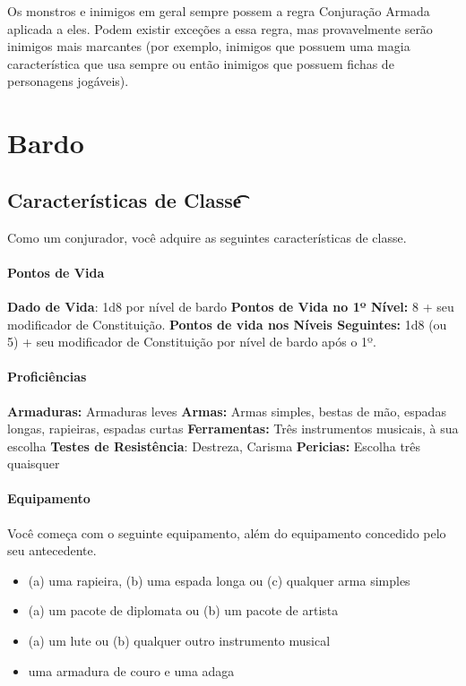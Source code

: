 \documentclass{RPG_Adventure}[2021/10/20]
\begin{document}
Os monstros e inimigos em geral sempre possem a regra Conjuração Armada aplicada
a eles. Podem existir exceções a essa regra, mas provavelmente serão inimigos
mais marcantes (por exemplo, inimigos que possuem uma magia característica que
usa sempre ou então inimigos que possuem fichas de personagens jogáveis).


\chapter{Bardo}%
\label{cha:bardo}

\section*{Características de Classe\t\t}%
\label{sec:caracteristicas_de_classe}

Como um conjurador, você adquire as seguintes características de classe.

\subsubsection{Pontos de Vida}%
\label{ssub:pontos_de_vida}

\textbf{Dado de Vida}: 1d8 por nível de bardo \nl
\textbf{Pontos de Vida no 1º Nível:} 8 + seu modificador de Constituição. \nl
\textbf{Pontos de vida nos Níveis Seguintes:} 1d8 (ou 5) + seu modificador de
Constituição por nível de bardo após o 1º.

\subsubsection{Proficiências}%
\label{ssub:proficiencias}

\textbf{Armaduras:} Armaduras leves \nl
\textbf{Armas:} Armas simples, bestas de mão, espadas longas, rapieiras, espadas curtas \nl
\textbf{Ferramentas:} Três instrumentos musicais, à sua escolha \jump
\textbf{Testes de Resistência}: Destreza, Carisma \nl
\textbf{Pericias:} Escolha três quaisquer

\subsubsection{Equipamento}%
\label{ssub:equipamento}

Você começa com o seguinte equipamento, além do equipamento concedido pelo seu
antecedente.
\begin{itemize}
    \item (a) uma rapieira, (b) uma espada longa ou (c) qualquer arma simples
    \item (a) um pacote de diplomata ou (b) um pacote de artista
    \item (a) um lute ou (b) qualquer outro instrumento musical
    \item uma armadura de couro e uma adaga
\end{itemize}
\end{document}
